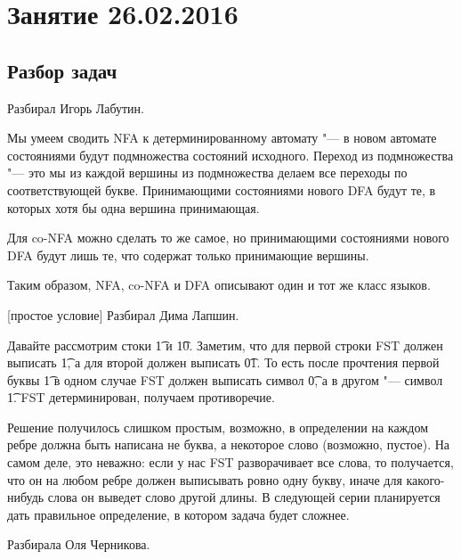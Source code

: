 \chapter{Занятие 26.02.2016}
\section{Разбор задач}

	Разбирал Игорь Лабутин.

	Мы умеем сводить NFA к детерминированному автомату "--- в новом
	автомате состояниями будут подмножества состояний исходного.
	Переход из подмножества "--- это мы из каждой вершины из подмножества
	делаем все переходы по соответствующей букве.
	Принимающими состояниями нового DFA будут те, в которых хотя бы одна вершина принимающая.

	Для co-NFA можно сделать то же самое, но принимающими состояниями нового DFA
	будут лишь те, что содержат только принимающие вершины.

	Таким образом, NFA, co-NFA и DFA описывают один и тот же класс языков.

[простое условие]\label{prob11easy}
	Разбирал Дима Лапшин.

	Давайте рассмотрим стоки \t{1} и \t{10}.
	Заметим, что для первой строки FST должен выписать \t{1},
	а для второй должен выписать \t{01}.
	То есть после прочтения первой буквы \t{1} в одном случае FST
	должен выписать символ \t{0}, а в другом "--- символ \t{1}.
	FST детерминирован, получаем противоречие.

	Решение получилось слишком простым, возможно, в определении на каждом
	ребре должна быть написана не буква, а некоторое слово (возможно, пустое).
	На самом деле, это неважно: если у нас FST разворачивает все слова,
	то получается, что он на любом ребре должен выписывать ровно одну букву,
	иначе для какого-нибудь слова он выведет слово другой длины.
	В следующей серии планируется дать правильное определение, в котором задача будет сложнее.

	Разбирала Оля Черникова.


